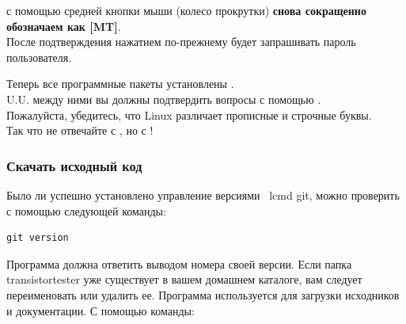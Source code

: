 с помощью средней кнопки мыши (колесо прокрутки) \textbf {снова сокращенно обозначаем как [MT]}.\\
После подтверждения нажатием   по-прежнему будет запрашивать пароль пользователя.

Теперь все программные пакеты установлены . \\
U.U. между ними вы должны подтвердить вопросы с помощью .
\\ Пожалуйста, убедитесь, что Linux различает прописные и строчные буквы.
\\ Так что не отвечайте с , но с !
\subsubsection{Скачать исходный код}
Было ли успешно установлено управление версиями \ lcmd {git},
можно проверить с помощью следующей команды: 
\begin{large} \vspace{-0.4em} \begin{verbatim}
git version
\end{verbatim} \end{large}
Программа  должна ответить выводом номера своей версии.
Если папка transistortester уже существует в вашем домашнем каталоге,
вам следует переименовать или удалить ее.
Программа  используется для загрузки исходников и документации.
С помощью команды:

